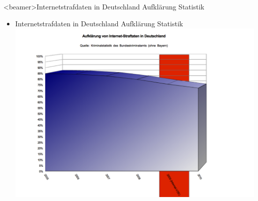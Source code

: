           \begin{frame}<beamer>{Internetstrafdaten in Deutschland Aufklärung Statistik}
\begin{itemize}
        \item Internetstrafdaten in Deutschland Aufklärung Statistik
        \includegraphics[height=1\textheight]{sections/img/aufklaerung_internetdelikte_DE.png}
    \end{itemize}
    \end{frame}
